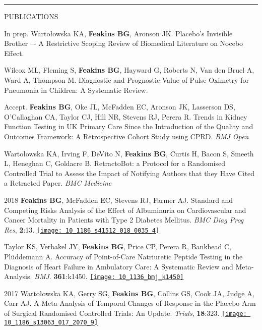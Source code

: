 \documentclass[10pt,a4paper]{article}
\begin{document}
\noindent\rule{\textwidth}{0.4pt}
\begin{cvlist}{PUBLICATIONS}
  
  \item[In prep.]
  Warto\l{}owska KA, \textbf{Feakins BG}, Aronson JK. Placebo’s Invisible Brother –- A Restrictive Scoping Review of Biomedical Literature on Nocebo Effect.
  
  \item[]
  Wilcox ML, Fleming S, \textbf{Feakins BG}, Hayward G, Roberts N, Van den Bruel A, Ward A, Thompson M. Diagnostic and Prognostic Value of Pulse Oximetry for Pneumonia in Children: A Systematic Review.
  
  \item[Accept.]
  \textbf{Feakins BG}, Oke JL, McFadden EC, Aronson JK, Lasserson DS, O'Callaghan CA, Taylor CJ, Hill NR, Stevens RJ, Perera R. Trends in Kidney Function Testing in UK Primary Care Since the Introduction of the Quality and Outcomes Framework: A Retrospective Cohort Study using CPRD. \textit{BMJ Open}
  
  \item[]
  Warto\l{}owska KA, Irving F, DeVito N, \textbf{Feakins BG}, Curtis H, Bacon S, Smeeth L, Heneghan C, Goldacre B. RetractoBot: a Protocol for a Randomised Controlled Trial to Assess the Impact of Notifying Authors that they Have Cited a Retracted Paper. \textit{BMC Medicine} 
  
  \item[2018]
  \textbf{Feakins BG}, McFadden EC, Stevens RJ, Farmer AJ. Standard and Competing Risks Analysis of the Effect of Albuminuria on Cardiovascular and Cancer Mortality in Patients with Type 2 Diabetes Mellitus. \textit{BMC Diag Prog Res}, \textbf{2}:13.  \href{https://biomedcentral.altmetric.com/details/45475518}{\texttt{[image: 10\_1186\_s41512\_018\_0035\_4]}}
  
  \item[]
  Taylor KS, Verbakel JY, \textbf{Feakins BG}, Price CP, Perera R, Bankhead C, Pl\"uddemann A. Accuracy of Point-of-Care Natriuretic Peptide Testing in the Diagnosis of Heart Failure in Ambulatory Care: A Systematic Review and Meta-Analysis. \textit{BMJ}. \textbf{361}:k1450.  \href{https://bmj.altmetric.com/details/42193657}{\texttt{[image: 10\_1136\_bmj\_k1450]}}
  
  \item[2017]
  Warto\l{}owska KA, Gerry SG, \textbf{Feakins BG}, Collins GS, Cook JA, Judge A, Carr AJ. A Meta-Analysis of Temporal Changes of Response in the Placebo Arm of Surgical Randomised Controlled Trials: An Update. \textit{Trials}, \textbf{18}:323.  \href{https://biomedcentral.altmetric.com/details/21804060}{\texttt{[image: 10\_1186\_s13063\_017\_2070\_9]}}
  

\end{cvlist}
\end{document}
